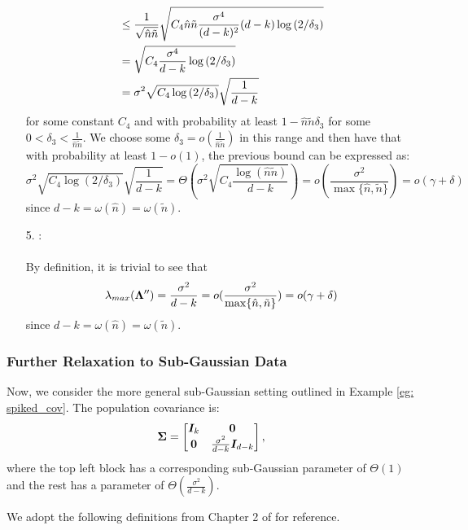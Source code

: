 \begin{enumerate}
\begin{align}
    & \leq \frac{1}{\sqrt{\hat{n}\tilde{n}}} \sqrt{C_4\hat{n}\tilde{n}\frac{\sigma^4}{(d-k)^2}(d-k)\log{(2/\delta_3)}}  \notag \\
    & = \sqrt{C_4\frac{\sigma^4}{d-k}\log{(2/\delta_3)}}  \notag \\
    & = \sigma^2\sqrt{C_4\log{(2/\delta_3)}}\sqrt{\frac{1}{d-k}} \notag
\end{align}
for some constant $C_4$ and with probability at least $1-\hat{n}\tilde{n}\delta_3$ for some $0 < \delta_3 < \frac{1}{\hat{n}\tilde{n}}$. We choose some $\delta_3 = o(\frac{1}{\hat{n}\tilde{n}})$ in this range and then have that with probability at least $1-o(1)$, the previous bound can be expressed as: 
\[
    \sigma^2\sqrt{C_4\log{(2/\delta_3)}}\sqrt{\frac{1}{d-k}} = \Theta \left(\sigma^2\sqrt{C_4\frac{\log(\hat{n}\tilde{n})}{d-k}} \right) = o(\frac{\sigma^2}{\max \{\hat{n}, \tilde{n}\}}) = o(\gamma+\delta)
\]
since $d-k = \omega(\hat{n}) = \omega(\tilde{n})$. 
    \item[5.] \dimini{}: \\ \\
    By definition, it is trivial to see that
\[
    \lambda_{max}({\bm{\Lambda}}'') = \frac{\sigma^2}{d-k} = o(\frac{\sigma^2}{\max \{\hat{n}, \tilde{n}\}}) =o(\gamma+\delta)
\]
since $d-k = \omega(\hat{n}) = \omega(\tilde{n})$. 
\end{enumerate}

\subsubsection{Further Relaxation to Sub-Gaussian Data}

Now, we consider the more general sub-Gaussian setting outlined in Example \ref{eg: spiked_cov}. The population covariance is: 
\[
    {\bm{\Sigma}}  = \begin{bmatrix}
        {\bm{I}}_k  & \mathbf{0} \\
        \mathbf{0} & \frac{\sigma^2}{d-k}{\bm{I}}_{d-k}
    \end{bmatrix}, 
\]
where the top left block has a corresponding sub-Gaussian parameter of $\Theta(1)$ and the rest has a parameter of $\Theta(\frac{\sigma^2}{d-k})$. 

We adopt the following definitions from Chapter 2 of \cite{vershynin2018high} for reference. 

